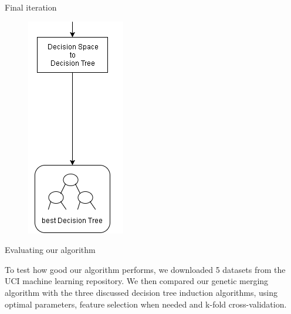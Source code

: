\documentclass[english]{beamer}
\begin{document}
{
\begin{frame}{Final iteration}
	\vspace{-1em}
	\begin{figure}
		\centering
		\includegraphics[scale=0.7]{figures/final_iteration.png}
	\end{figure}
\end{frame} }



\begin{frame}{Evaluating our algorithm}
	\begin{block}{}
		To test how good our algorithm performs, we downloaded 5 datasets from the UCI machine learning repository. We then compared our genetic merging algorithm with the three discussed decision tree induction algorithms, using optimal parameters, feature selection when needed and k-fold cross-validation.
	\end{block}
\end{frame}
\end{document}
